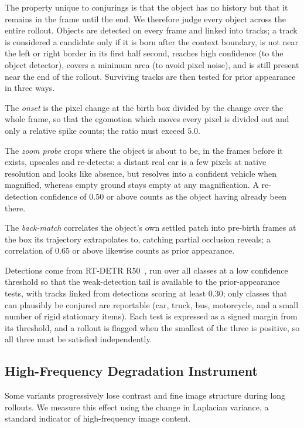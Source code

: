 \documentclass[letterpaper]{article} %
\begin{document}
The property unique to conjurings is that the object has no history but that it remains in the frame until the end. We therefore judge every object across the entire rollout.
Objects are detected on every frame and linked into tracks; a track is considered a candidate
only if it is born after the context boundary, is not near the left or right border in its
first half second, reaches high confidence (to the object detector), covers a minimum area (to avoid pixel noise), and is still present near
the end of the rollout. Surviving tracks are then tested for prior appearance in three ways.

The \emph{onset} is the pixel change at the birth box divided by the change over the whole
frame, so that the egomotion which moves every pixel is divided out and only a relative spike
counts; the ratio must exceed $5.0$.

The \emph{zoom probe} crops where the object is about to be, in the frames before it exists,
upscales and re-detects: a distant real car is a few pixels at native resolution and looks like
absence, but resolves into a confident vehicle when magnified, whereas empty ground stays empty
at any magnification. A re-detection confidence of $0.50$ or above counts as the object having
already been there.

The \emph{back-match} correlates the object's own settled patch into pre-birth frames at the box
its trajectory extrapolates to, catching partial occlusion reveals; a correlation of $0.65$ or
above likewise counts as prior appearance.

Detections come from RT-DETR R50~\cite{zhao2024detrs}, run over all classes at a low confidence
threshold so that the weak-detection tail is available to the prior-appearance tests, with
tracks linked from detections scoring at least $0.30$; only classes that can plausibly be
conjured are reportable (car, truck, bus, motorcycle, and a small number of rigid stationary
items). Each test is expressed as a signed margin from its threshold, and a rollout is flagged
when the smallest of the three is positive, so all three must be satisfied independently.


\subsection{High-Frequency Degradation Instrument}
\label{app:high_frequency_metric}

Some variants progressively lose contrast and fine image structure during
long rollouts. We measure this effect using the change in Laplacian variance,
a standard indicator of high-frequency image content.
\end{document}
